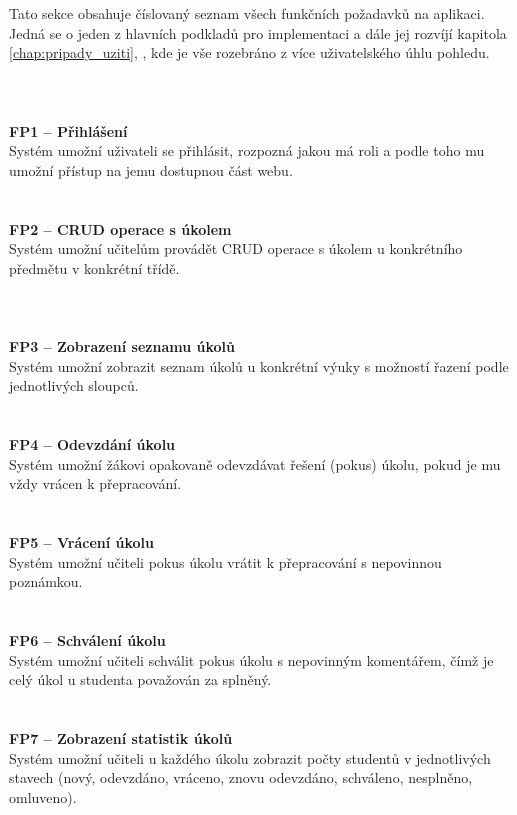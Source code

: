 \documentclass[twoside]{ctuthesis}
\theoremstyle{plain}
\theoremstyle{definition}
\theoremstyle{note}
\begin{document}
Tato sekce obsahuje číslovaný seznam všech funkčních požadavků na aplikaci. Jedná se o jeden z hlavních podkladů pro implementaci a dále jej rozvíjí kapitola \ref{chap:pripady_uziti}, , kde je vše rozebráno z více uživatelského úhlu pohledu.
\\\\\\\\
\textbf{\Large FP1 -- Přihlášení}\\
Systém umožní uživateli se přihlásit, rozpozná jakou má roli a podle toho mu umožní přístup na jemu dostupnou část webu.
\\\\\\\textbf{\Large FP2 -- CRUD operace s úkolem}\\
Systém umožní učitelům provádět CRUD operace s úkolem u konkrétního předmětu v konkrétní třídě.
\\\\\\\\
\textbf{\Large FP3 -- Zobrazení seznamu úkolů}\\
Systém umožní zobrazit seznam úkolů u konkrétní výuky s možností řazení podle jednotlivých sloupců.
\\\\\\
\textbf{\Large FP4 -- Odevzdání úkolu}\\
Systém umožní žákovi opakovaně odevzdávat řešení (pokus) úkolu, pokud je mu vždy vrácen k přepracování.
\\\\\\
\textbf{\Large FP5 -- Vrácení úkolu}\\
Systém umožní učiteli pokus úkolu vrátit k přepracování s nepovinnou poznámkou.
\\\\\\
\textbf{\Large FP6 -- Schválení úkolu}\\
Systém umožní učiteli schválit pokus úkolu s nepovinným komentářem, čímž je celý úkol u studenta považován za splněný.
\\\\\\
\textbf{\Large FP7 -- Zobrazení statistik úkolů}\\
Systém umožní učiteli u každého úkolu zobrazit počty studentů v jednotlivých stavech (nový, odevzdáno, vráceno, znovu odevzdáno, schváleno, nesplněno, omluveno).
\end{document}
